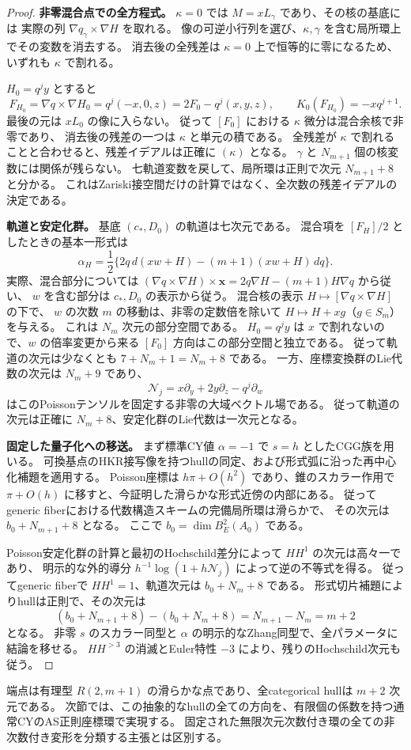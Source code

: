 \begin{proof}
\medskip\noindent
\textbf{非零混合点での全方程式。}
$\kappa=0$ では $M=xL_\gamma$ であり、その核の基底には
実際の列 $\nabla q_\gamma\times\nabla H$ を取れる。
像の可逆小行列を選び、$\kappa,\gamma$ を含む局所環上でその変数を消去する。
消去後の全残差は $\kappa=0$ 上で恒等的に零になるため、いずれも $\kappa$ で割れる。

$H_0=q^j y$ とすると
\[
 F_{H_0}=\nabla q\times\nabla H_0=q^j(-x,0,z)
       =2F_0-q^j(x,y,z),
 \qquad K_0(F_{H_0})=-xq^{j+1}.
\]
最後の元は $xL_0$ の像に入らない。
従って $[F_0]$ における $\kappa$ 微分は混合余核で非零であり、
消去後の残差の一つは $\kappa$ と単元の積である。
全残差が $\kappa$ で割れることと合わせると、残差イデアルは正確に $(\kappa)$ となる。
$\gamma$ と $N_{m+1}$ 個の核変数には関係が残らない。
七軌道変数を戻して、局所環は正則で次元 $N_{m+1}+8$ と分かる。
これはZariski接空間だけの計算ではなく、全次数の残差イデアルの決定である。

\medskip\noindent
\textbf{軌道と安定化群。}
基底 $(c_*,D_0)$ の軌道は七次元である。
混合項を $[F_H]/2$ としたときの基本一形式は
\[
 \alpha_H=\frac12\{2q\,d(xw+H)-(m+1)(xw+H)\,dq\}.
\]
実際、混合部分については
$(\nabla q\times\nabla H)\times\mathbf x
 =2q\nabla H-(m+1)H\nabla q$ から従い、
$w$ を含む部分は $c_*,D_0$ の表示から従う。
混合核の表示 $H\mapsto[\nabla q\times\nabla H]$ の下で、
$w$ の次数 $m$ の移動は、非零の定数倍を除いて $H\mapsto H+xg$（$g\in S_m$）を与える。
これは $N_m$ 次元の部分空間である。
$H_0=q^j y$ は $x$ で割れないので、$w$ の倍率変更から来る
$[F_0]$ 方向はこの部分空間と独立である。
従って軌道の次元は少なくとも $7+N_m+1=N_m+8$ である。
一方、座標変換群のLie代数の次元は $N_m+9$ であり、
\[
 \mathcal N_j=x\partial_y+2y\partial_z-q^j\partial_w
\]
はこのPoissonテンソルを固定する非零の大域ベクトル場である。
従って軌道の次元は正確に $N_m+8$、安定化群のLie代数は一次元となる。

\medskip\noindent
\textbf{固定した量子化への移送。}
まず標準CY値 $\alpha=-1$ で $s=h$ としたCGG族を用いる。
可換基点のHKR接写像を持つhullの同定、および形式弧に沿った再中心化補題を適用する。
Poisson座標は $h\pi+O(h^2)$ であり、錐のスカラー作用で
$\pi+O(h)$ に移すと、今証明した滑らかな形式近傍の内部にある。
従ってgeneric fiberにおける代数構造スキームの完備局所環は滑らかで、
その次元は $b_0+N_{m+1}+8$ となる。
ここで $b_0=\dim B_E^2(A_0)$ である。

Poisson安定化群の計算と最初のHochschild差分によって $HH^1$ の次元は高々一であり、
明示的な外的導分 $h^{-1}\log(1+h\mathcal N_j)$ によって逆の不等式を得る。
従ってgeneric fiberで $HH^1=1$、軌道次元は $b_0+N_m+8$ である。
形式切片補題によりhullは正則で、その次元は
\[
 (b_0+N_{m+1}+8)-(b_0+N_m+8)=N_{m+1}-N_m=m+2
\]
となる。
非零 $s$ のスカラー同型と $\alpha$ の明示的なZhang同型で、全パラメータに結論を移せる。
$HH^{>3}$ の消滅とEuler特性 $-3$ により、残りのHochschild次元も従う。
\end{proof}

\begin{remark}[端点の変形の意味]
端点は有理型 $R(2,m+1)$ の滑らかな点であり、全categorical hullは $m+2$ 次元である。
次節では、この抽象的なhullの全ての方向を、有限個の係数を持つ通常CYのAS正則座標環で実現する。
固定された無限次元次数付き環の全ての非次数付き変形を分類する主張とは区別する。
\end{remark}
